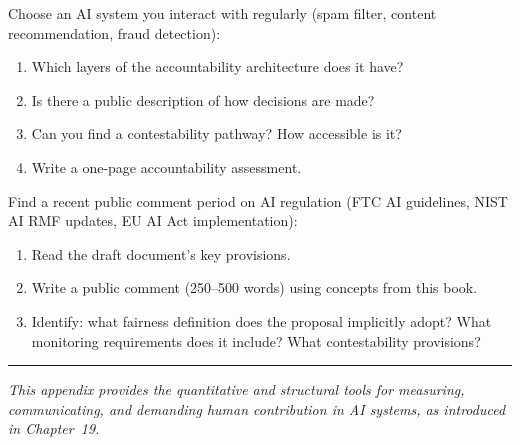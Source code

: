 \begin{Exercise}
Choose an AI system you interact with regularly (spam filter, content recommendation, fraud detection):
\begin{enumerate}
    \item Which layers of the accountability architecture does it have?
    \item Is there a public description of how decisions are made?
    \item Can you find a contestability pathway? How accessible is it?
    \item Write a one-page accountability assessment.
\end{enumerate}
\end{Exercise}

\begin{Exercise}
Find a recent public comment period on AI regulation (FTC AI guidelines, NIST AI RMF updates, EU AI Act implementation):
\begin{enumerate}
    \item Read the draft document's key provisions.
    \item Write a public comment (250--500 words) using concepts from this book.
    \item Identify: what fairness definition does the proposal implicitly adopt? What monitoring requirements does it include? What contestability provisions?
\end{enumerate}
\end{Exercise}

\bigskip
\begin{center}
\rule{0.5\textwidth}{0.4pt}
\end{center}
\bigskip

\noindent\textit{This appendix provides the quantitative and structural tools for measuring, communicating, and demanding human contribution in AI systems, as introduced in Chapter~19.}
\apxnumoff
